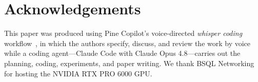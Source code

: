 \documentclass[11pt]{article}
\begin{document}


\section*{Acknowledgements}

This paper was produced using Pine Copilot's voice-directed \emph{whisper coding} workflow~\citep{pineai2026whispercoding}, in which the authors specify, discuss, and review the work by voice while a coding agent---Claude Code with Claude Opus 4.8---carries out the planning, coding, experiments, and paper writing.
We thank BSQL Networking for hosting the NVIDIA RTX PRO 6000 GPU.




\appendix

\end{document}
